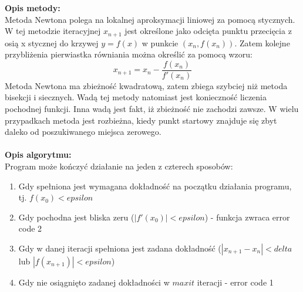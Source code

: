 \documentclass[12pt]{article}
\begin{document}
\noindent \textbf{Opis metody:}\\
Metoda Newtona polega na lokalnej aproksymacji liniowej za pomocą stycznych. W tej metodzie iteracyjnej $x_{n+1}$ jest określone jako odcięta punktu przecięcia z osią x stycznej do krzywej $y=f(x)$ w punkcie $(x_n,f(x_n))$. Zatem kolejne przybliżenia pierwiastka równiania można określić za pomocą wzoru:
\begin{equation*}
x_{n+1}=x_n-\frac{f(x_n)}{f'(x_n)}
\end{equation*}
Metoda Newtona ma zbieżność kwadratową, zatem zbiega szybciej niż metoda bisekcji i siecznych. Wadą tej metody natomiast jest konieczność liczenia pochodnej funkcji. Inna wadą jest fakt, iż zbieżność nie zachodzi zawsze. W wielu przypadkach metoda jest rozbieżna, kiedy punkt startowy znajduje się zbyt daleko od poszukiwanego miejsca zerowego.
\\
\\
\noindent \textbf{Opis algorytmu:}\\
Program może kończyć działanie na jeden z czterech sposobów:
\begin{enumerate}
	\item Gdy spełniona jest wymagana dokładność na początku działania programu, tj. $f(x_0) < epsilon$
	\item Gdy pochodna jest bliska zeru ($|f'(x_0)|<epsilon$) - funkcja zwraca error code 2
	\item Gdy w danej iteracji spełniona jest zadana dokładność ($|x_{n+1}-x_n|<delta$ lub $|f(x_{n+1})|<epsilon$)
	\item Gdy nie osiągnięto zadanej dokładności w $maxit$ iteracji - error code 1
\end{enumerate}
\end{document}

